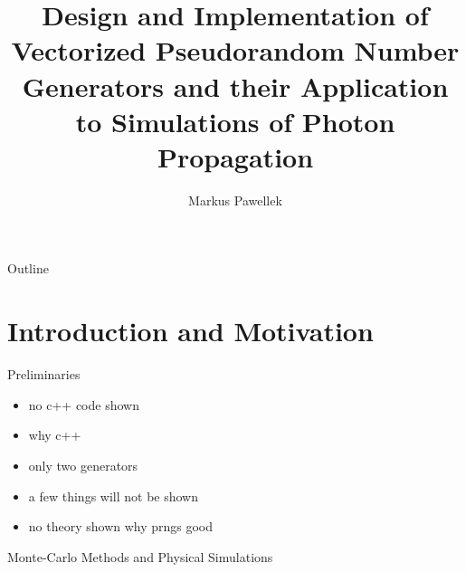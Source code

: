 \documentclass[aspectratio=169]{beamer}
\title{Design and Implementation of Vectorized Pseudorandom Number Generators and their Application to Simulations of Photon Propagation}
\author{Markus Pawellek}
\begin{document}

  \frame{\titlepage}
  \begin{frame}{Outline}
    \footnotesize
    \hfill\parbox[t][7cm][l]{0.9\textwidth}{\tableofcontents}
  \end{frame}

  \section{Introduction and Motivation} %
  \label{sec:introduction_and_motivation}
    \begin{frame}{Preliminaries}
      \begin{itemize}
        \item no c++ code shown
        \item why c++
        \item only two generators
        \item a few things will not be shown
        \item no theory shown why prngs good

      \end{itemize}
    \end{frame}

    \begin{frame}{Monte-Carlo Methods and Physical Simulations}

    \end{frame}
\end{document}
